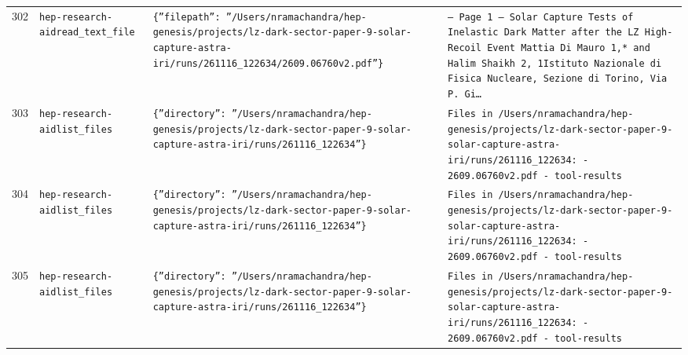 \documentclass[11pt,a4paper]{article}
\begin{document}
\begin{longtable}{@{}p{}p{}p{}p{}@{}}
302 & \texttt{hep-research-aid}\newline\texttt{read\_\allowbreak{}text\_\allowbreak{}file} & \texttt{\{''filepath'':\allowbreak{} ''/\allowbreak{}Users/\allowbreak{}nramachandra/\allowbreak{}hep-genesis/\allowbreak{}projects/\allowbreak{}lz-dark-sector-paper-9-solar-capture-astra-iri/\allowbreak{}runs/\allowbreak{}261116\_\allowbreak{}122634/\allowbreak{}2609.06760v2.pdf''\}\allowbreak{}} & \texttt{--- Page 1 --- Solar Capture Tests of Inelastic Dark Matter after the LZ High-Recoil Event Mattia Di Mauro 1,\allowbreak{}* and Halim Shaikh 2,\allowbreak{}\dag{}\allowbreak{} 1Istituto Nazionale di Fisica Nucleare,\allowbreak{} Sezione di Torino,\allowbreak{} Via P. Gi\ldots{}\allowbreak{}} \\
303 & \texttt{hep-research-aid}\newline\texttt{list\_\allowbreak{}files} & \texttt{\{''directory'':\allowbreak{} ''/\allowbreak{}Users/\allowbreak{}nramachandra/\allowbreak{}hep-genesis/\allowbreak{}projects/\allowbreak{}lz-dark-sector-paper-9-solar-capture-astra-iri/\allowbreak{}runs/\allowbreak{}261116\_\allowbreak{}122634''\}\allowbreak{}} & \texttt{Files in /\allowbreak{}Users/\allowbreak{}nramachandra/\allowbreak{}hep-genesis/\allowbreak{}projects/\allowbreak{}lz-dark-sector-paper-9-solar-capture-astra-iri/\allowbreak{}runs/\allowbreak{}261116\_\allowbreak{}122634:\allowbreak{}   - 2609.06760v2.pdf   - tool-results} \\
304 & \texttt{hep-research-aid}\newline\texttt{list\_\allowbreak{}files} & \texttt{\{''directory'':\allowbreak{} ''/\allowbreak{}Users/\allowbreak{}nramachandra/\allowbreak{}hep-genesis/\allowbreak{}projects/\allowbreak{}lz-dark-sector-paper-9-solar-capture-astra-iri/\allowbreak{}runs/\allowbreak{}261116\_\allowbreak{}122634''\}\allowbreak{}} & \texttt{Files in /\allowbreak{}Users/\allowbreak{}nramachandra/\allowbreak{}hep-genesis/\allowbreak{}projects/\allowbreak{}lz-dark-sector-paper-9-solar-capture-astra-iri/\allowbreak{}runs/\allowbreak{}261116\_\allowbreak{}122634:\allowbreak{}   - 2609.06760v2.pdf   - tool-results} \\
305 & \texttt{hep-research-aid}\newline\texttt{list\_\allowbreak{}files} & \texttt{\{''directory'':\allowbreak{} ''/\allowbreak{}Users/\allowbreak{}nramachandra/\allowbreak{}hep-genesis/\allowbreak{}projects/\allowbreak{}lz-dark-sector-paper-9-solar-capture-astra-iri/\allowbreak{}runs/\allowbreak{}261116\_\allowbreak{}122634''\}\allowbreak{}} & \texttt{Files in /\allowbreak{}Users/\allowbreak{}nramachandra/\allowbreak{}hep-genesis/\allowbreak{}projects/\allowbreak{}lz-dark-sector-paper-9-solar-capture-astra-iri/\allowbreak{}runs/\allowbreak{}261116\_\allowbreak{}122634:\allowbreak{}   - 2609.06760v2.pdf   - tool-results} \\

\end{longtable}
\end{document}
